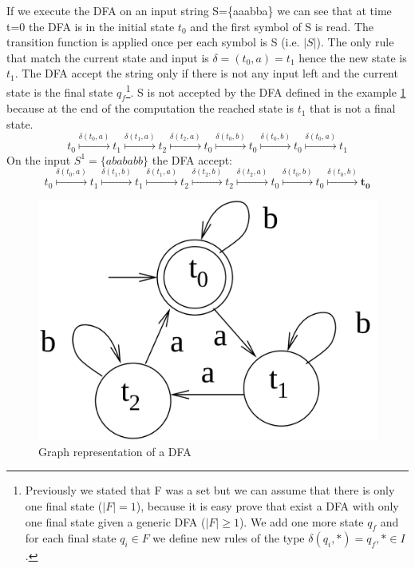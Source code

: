 If we execute the DFA on an input string S=\{aaabba\} we can see that at time
t=0 the DFA is in the initial state $t_0$ and the first
symbol of S is read.
The transition function is applied once per each symbol is S
(i.e. $\left\vert{S}\right\vert$). The only rule that match 
the current state and input is $\delta=(t_0,a)=t_1 $ hence the
new state is $t_1$. The DFA accept the string only if  there
is not any input left and the current state is the final state
$q_f$\footnote{Previously we stated that F was a set but
we can assume that there is only one final state
($\left\vert{F}\right\vert=1$), because it is easy prove
that exist a DFA with only one final state given a generic DFA
($\left\vert{F}\right\vert \geq 1$). We add one more state
$q_f$ and for each final state $q_i \in
F$ we define new rules of the type $\delta(q_i,*)=q_f, * \in I $.}.
S is not accepted by the DFA defined in the example \ref{amod3Automata} because
at the end of the computation the reached state is $t_1$
that is not a final state.
 \[
 t_0\overset{\delta(t_0,a)}
 {\longmapsto}t_{1}\overset{\delta(t_1,a)}
 {\longmapsto}t_{2}\overset{\delta(t_2,a)}
 {\longmapsto} t_{0}\overset{\delta(t_0,b)}
 {\longmapsto}t_{0}\overset{\delta(t_0,b)}
 {\longmapsto}t_{0}\overset{\delta(t_0,a)}
 {\longmapsto} t_{1}
\]
On the input $S^1=\{abababb\}$ the DFA accept:
 \[
 t_0\overset{\delta(t_0,a)}
 {\longmapsto}t_{1}\overset{\delta(t_1,b)}
 {\longmapsto}t_{1}\overset{\delta(t_1,a)}
 {\longmapsto} t_{2}\overset{\delta(t_2,b)}
 {\longmapsto}t_{2}\overset{\delta(t_2,a)}
 {\longmapsto}t_{0}\overset{\delta(t_0,b)}
 {\longmapsto}t_{0}\overset{\delta(t_0,b)}
 {\longmapsto}\mathbf{t_{0}}
\]
\begin{figure}
\begin{center}
  \includegraphics[scale=0.17]{./images/amod3Automata}
  \caption{Graph representation of a DFA}
  \label{amod3Automata}
\end{center}
\end{figure}
\FloatBarrier


